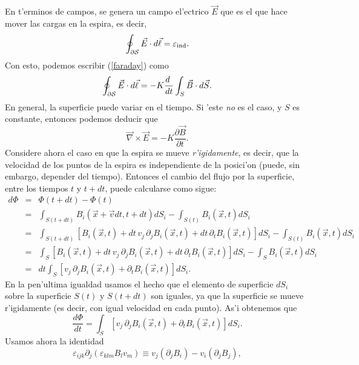 En t'erminos de campos, se genera un campo el'ectrico $\vec{E}$ que es el que hace mover las cargas en la espira, es decir,
\begin{equation}
\oint_{\cal\partial S}\vec{E}\cdot d\vec{\ell}=\varepsilon_{\rm ind}.
\end{equation}
Con esto, podemos escribir (\ref{faraday}) como
\begin{equation}
\oint_{\cal \partial S}\vec{E}\cdot d\vec{\ell}=-K\frac{d\ }{dt}\int_S\vec{B}\cdot
d\vec{S}.
\end{equation}
En general, la superficie puede variar en el tiempo. Si 'este \textit{no} es el caso, y $S$
es constante, entonces podemos deducir que
\begin{equation}\label{ley-faraday0}
\vec\nabla\times\vec{E}=-K\frac{\partial\vec{B}}{\partial t}.
\end{equation}
Considere ahora el caso en que la espira se mueve \textit{r'igidamente}, es decir, que la velocidad de los puntos de la espira es independiente de la posici'on (puede, sin embargo, depender del tiempo).
Entonces el cambio del flujo por la superficie, entre los tiempos $t$ y $t+dt$, puede calcularse como sigue:
\begin{eqnarray}
 d\Phi &=& \Phi(t+dt)-\Phi(t)\\
&=&
\int_{S(t+dt)}B_i(\vec{x}+\vec{v}dt,t+dt)dS_i-\int_{S(t)}B_i(\vec{x},t)dS_i\\
&=&\int_{S(t+dt)}\left[B_i(\vec{x},t)+dt\,v_j\,\partial_jB_i(\vec{x},
t)+dt\,\partial_tB_i(\vec{x},t)\right ] dS_i-\int_{S(t)}B_i(\vec{x},t)dS_i\\
&=&\int_S\left[B_i(\vec{x},t)+dt\,v_j\,\partial_jB_i(\vec{x},
t)+dt\,\partial_tB_i(\vec{x},t)\right ] dS_i-\int_SB_i(\vec{x},t)dS_i\\
&=&dt\int_S\left[v_j\,\partial_jB_i(\vec{x},t)+\partial_tB_i(\vec{x},t)\right
] dS_i.
\end{eqnarray}
En la pen'ultima igualdad usamos el hecho que el elemento de superficie $dS_i$ sobre la superficie $S(t)$ y $S(t+dt)$ son iguales, ya que la superficie se mueve r'igidamente (es decir, con igual velocidad en cada punto). As'i obtenemos que
\begin{equation}\label{dPhidt0}
 \frac{d\Phi}{dt}=\int_S\left[v_j\,\partial_jB_i(\vec{x},t)+\partial_tB_i(\vec
{x},t)\right] dS_i.
\end{equation}
Usamos ahora la identidad
\begin{equation}
\varepsilon_{ijk}\partial_j(\varepsilon_{klm}B_lv_m)\equiv
v_j(\partial_jB_i)-v_i(\partial_jB_j),
\end{equation}
